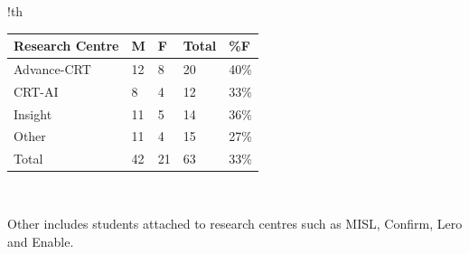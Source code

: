 
\begin{tabbox}{!th}
\caption{CSIT PhD students registered 2022-23
by centre and gender}
\label{tab:phdregistrations2223}
\footnotesize 



\begin{tabular}{p{3cm}
                R{1cm}
                R{1cm}           
                R{1cm}
                R{1cm}
                }
\toprule                 
\textmd{Research Centre}&
\textmd{M}&
\textmd{F}&
\textmd{Total}&
\textmd{\%F}\\ 
\midrule 
Advance-CRT&
12& 8& 20& 40\%\\
\hdashline
CRT-AI&
8& 4& 12& 33\%\\
\hdashline
Insight&
11& 5& 14& 36\%\\
\hdashline
Other&
11& 4& 15& 27\%\\
\midrule 

Total&
42& 21& 63& 33\%\\

\bottomrule 
\end{tabular}
\vspace{2mm}\\
{
\sffamily

Other includes students attached to research centres such as 
MISL, Confirm, Lero and Enable.
}

\end{tabbox}


